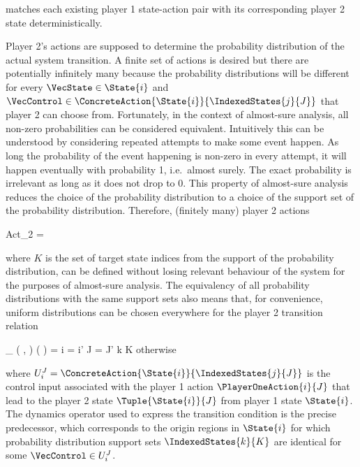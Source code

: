     matches each existing player 1 state-action pair with its corresponding player 2 state deterministically.

    Player 2's actions are supposed to determine the probability distribution of the actual system transition.
    A finite set of actions is desired but there are potentially infinitely many because the probability distributions will be different for every $\VecState \in \State{i}$ and $\VecControl \in \ConcreteAction{\State{i}}{\IndexedStates{j}{J}}$ that player 2 can choose from.
    Fortunately, in the context of almost-sure analysis, all non-zero probabilities can be considered equivalent.
    Intuitively this can be understood by considering repeated attempts to make some event happen.
    As long the probability of the event happening is non-zero in every attempt, it will happen eventually with probability 1, i.e.\ almost surely.
    The exact probability is irrelevant as long as it does not drop to 0.
    This property of almost-sure analysis reduces the choice of the probability distribution to a choice of the support set of the probability distribution.
    Therefore, (finitely many) player 2 actions

    \startformula
        Act_2 =  \EndComma
    \stopformula

    where $K$ is the set of target state indices from the support of the probability distribution, can be defined without losing relevant behaviour of the system for the purposes of almost-sure analysis.
    The equivalency of all probability distributions with the same support sets also means that, for convenience, uniform distributions can be chosen everywhere for the player 2 transition relation

    \startformula
        \Transition_\GameGraph
            \Big( ,  \Big)
            \Big(  \Big)
        = \startmathcases
            \NC \displaystyle{}
            \MC \startgathered
                    \NC \StartIf i = i' \MidAnd J = J' \MidAnd k \in K
                    \NR
                    \NC \quad \MidAnd {} \neq \emptyset
                    \NR
                \stopgathered
            \NR
            \NC otherwise \EndComma
            \NR
        \stopmathcases
    \stopformula

    where $U_i^J = \ConcreteAction{\State{i}}{\IndexedStates{j}{J}}$ is the control input associated with the player 1 action $\PlayerOneAction{i}{J}$ that lead to the player 2 state $\Tuple{\State{i}}{J}$ from player 1 state $\State{i}$.
    The dynamics operator used to express the transition condition is the precise predecessor, which corresponds to the origin regions in $\State{i}$ for which probability distribution support sets $\IndexedStates{k}{K}$ are identical for some $\VecControl \in U_i^J$.

